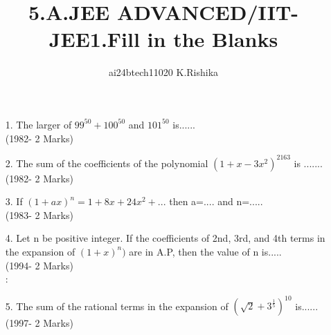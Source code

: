 \documentclass[journal,12pt,twocolumn]{IEEEtran}
\theoremstyle{remark}
\begin{document}

\vspace{3cm}

\title{5.A.JEE ADVANCED/IIT-JEE1.Fill in the Blanks}
\author{ai24btech11020 K.Rishika}
\begin{enumerate}
\maketitle
\item[1.] The larger of $99^{50}+100^{50}$ and $101^{50}$ is......\\[2pt]
	\hfill{(1982- 2 Marks)}\\[6pt]
\item[2.]The sum of the coefficients of the polynomial $(1+x-3x^2)^2163$ is .......\\[2pt]
	\hfill{(1982- 2 Marks)}\\[6pt]
\item[3.]If $(1+ax)^n=1+8x+24x^2+...$ then a=.... and n=.....\\[2pt]
	\hfill{(1983- 2 Marks)}\\[6pt]
\item[4.]Let n be positive integer. If the coefficients of 2nd, 3rd, and 4th terms in the expansion of $(1 + x)^n)$ are in A.P, then the value of n is.....\\[2pt]
	\hfill{(1994- 2 Marks)}\\[6pt]:
\item[5.]The sum of the rational terms in the expansion of $(\sqrt{2}+3^\frac{1}{5})^{10}$ is......\\[2pt]
	\hfill{(1997- 2 Marks)}
\bigskip
\renewcommand{\thefigure}{\theenumi}
\renewcommand{\thetable}{\theenumi}
\end{enumerate}
\end{document}
